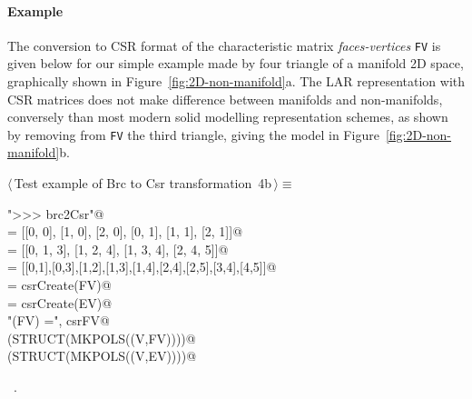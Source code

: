 \documentclass[11pt,oneside]{article}	%
\begin{document}
\paragraph{Example}
The conversion to CSR format of the characteristic matrix \emph{faces-vertices} \texttt{FV} is given below for our simple example made by four triangle of a manifold 2D space, graphically shown in Figure~\ref{fig:2D-non-manifold}a. The LAR representation with CSR matrices does not make difference between manifolds and non-manifolds, conversely than most modern solid modelling representation schemes, as shown by removing from \texttt{FV} the third triangle, giving the model in Figure~\ref{fig:2D-non-manifold}b.
\begin{flushleft} \small \label{scrap7}
\protect{}$\langle\,$Test example of Brc to Csr transformation\nobreak\ {\footnotesize 4b}$\,\rangle\equiv$
\vspace{-1ex}
\begin{list}{}{} \item
\mbox{}\verb@print "\n>>> brc2Csr"@\\
\mbox{}\verb@V = [[0, 0], [1, 0], [2, 0], [0, 1], [1, 1], [2, 1]]@\\
\mbox{}\verb@FV = [[0, 1, 3], [1, 2, 4], [1, 3, 4], [2, 4, 5]]@\\
\mbox{}\verb@EV = [[0,1],[0,3],[1,2],[1,3],[1,4],[2,4],[2,5],[3,4],[4,5]]@\\
\mbox{}\verb@csrFV = csrCreate(FV)@\\
\mbox{}\verb@csrEV = csrCreate(EV)@\\
\mbox{}\verb@print "\ncsrCreate(FV) =\n", csrFV@\\
\mbox{}\verb@VIEW(STRUCT(MKPOLS((V,FV))))@\\
\mbox{}\verb@VIEW(STRUCT(MKPOLS((V,EV))))@\\
\mbox{}\verb@@{\NWsep}
\end{list}
\vspace{-1ex}
\footnotesize\addtolength{\baselineskip}{-1ex}
\begin{list}{}{\setlength{\itemsep}{-\parsep}\setlength{\itemindent}{-\leftmargin}}
\item \NWtxtMacroRefIn\ .
\end{list}
\end{flushleft}
\end{document}
